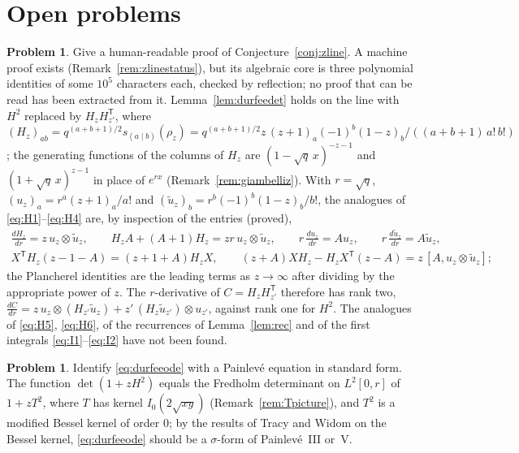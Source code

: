 \documentclass[11pt]{article}
\theoremstyle{definition}
\newtheorem{problem}[theorem]{Problem}
\theoremstyle{remark}
\begin{document}
\section{Open problems}\label{sec:open}

\begin{problem}
Give a human-readable proof of Conjecture~\ref{conj:zline}. A machine proof exists (Remark~\ref{rem:zlinestatus}), but its algebraic core is three polynomial identities of some $10^5$ characters each, checked by reflection; no proof that can be read has been extracted from it. Lemma~\ref{lem:durfeedet} holds on the line with $H^2$ replaced by $H_zH_{z'}^{\mathsf T}$, where $(H_z)_{ab}=q^{(a+b+1)/2}s_{(a\mid b)}(\rho_z)=q^{(a+b+1)/2}z\,(z+1)_a(-1)^b(1-z)_b/((a+b+1)\,a!\,b!)$; the generating functions of the columns of $H_z$ are $(1-\sqrt q\,x)^{-z-1}$ and $(1+\sqrt q\,x)^{z-1}$ in place of $e^{rx}$ (Remark~\ref{rem:giambelliz}). With $r=\sqrt q$, $(u_z)_a=r^a(z+1)_a/a!$ and $(\tilde u_z)_b=r^b(-1)^b(1-z)_b/b!$, the analogues of \eqref{eq:H1}--\eqref{eq:H4} are, by inspection of the entries (proved),
\begin{gather*}
\frac{dH_z}{dr}=z\,u_z\otimes\tilde u_z,\qquad
H_zA+(A+1)H_z=zr\,u_z\otimes\tilde u_z,\qquad r\,\frac{du_z}{dr}=Au_z,\qquad r\,\frac{d\tilde u_z}{dr}=A\tilde u_z,\\
X^{\mathsf T}H_z(z-1-A)=(z+1+A)H_zX,\qquad
(z+A)XH_z-H_zX^{\mathsf T}(z-A)=z\,[A,u_z\otimes\tilde u_z];
\end{gather*}
the Plancherel identities are the leading terms as $z\to\infty$ after dividing by the appropriate power of $z$. The $r$-derivative of $C=H_zH_{z'}^{\mathsf T}$ therefore has rank two, $\frac{dC}{dr}=z\,u_z\otimes(H_{z'}\tilde u_z)+z'\,(H_z\tilde u_{z'})\otimes u_{z'}$, against rank one for $H^2$. The analogues of \eqref{eq:H5}, \eqref{eq:H6}, of the recurrences of Lemma~\ref{lem:rec} and of the first integrals \eqref{eq:I1}--\eqref{eq:I2} have not been found.
\end{problem}

\begin{problem}
Identify \eqref{eq:durfeeode} with a Painlev\'e equation in standard form. The function $\det(1+zH^2)$ equals the Fredholm determinant on $L^2[0,r]$ of $1+zT^2$, where $T$ has kernel $I_0(2\sqrt{xy})$ (Remark~\ref{rem:Tpicture}), and $T^2$ is a modified Bessel kernel of order $0$; by the results of Tracy and Widom on the Bessel kernel, \eqref{eq:durfeeode} should be a $\sigma$-form of Painlev\'e~III or~V.
\end{problem}
\end{document}
